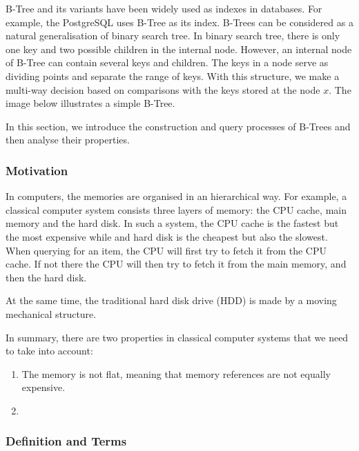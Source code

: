 B-Tree and its variants have been widely used as indexes in
databases. For example, the PostgreSQL uses B-Tree as its index. B-Trees
can be considered as a natural generalisation of binary search tree. In
binary search tree, there is only one key and two possible children in
the internal node. However, an internal node of B-Tree can contain
several keys and children. The keys in a node serve as dividing points
and separate the range of keys. With this structure, we make a
multi-way decision based on comparisons with the keys stored at the node
$x$. The image below illustrates a simple B-Tree.

In this section, we introduce the construction and query processes
of B-Trees and then analyse their properties.

\subsubsection{Motivation}

In computers, the memories are organised in an hierarchical way. For example, a classical computer system consists three layers of memory: the CPU cache, main memory and the hard disk. In such a system, the CPU cache is the fastest but the most expensive while and hard disk is the cheapest but also the slowest. When querying for an item, the CPU will first try to fetch it from the CPU cache. If not there the CPU will then try to fetch it from the main memory, and then the hard disk.


At the same time, the traditional hard disk drive (HDD) is made by a moving mechanical structure.



In summary, there are two properties in classical computer systems that we need to take into account:

\begin{enumerate}
	\item The memory is not flat, meaning that memory references are not equally expensive. 
	\item 
\end{enumerate}

\subsubsection{Definition and Terms}

